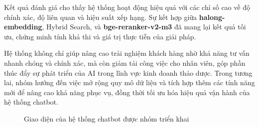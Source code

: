 \documentclass{article}
\numberwithin{equation}{section}
\numberwithin{equation}{section}
\begin{document}
Kết quả đánh giá cho thấy hệ thống hoạt động hiệu quả với các chỉ số cao về độ chính xác, độ liên quan và hiệu suất xếp hạng. Sự kết hợp giữa \textbf{halong-embedding}, Hybrid Search, và \textbf{bge-reranker-v2-m3} đã mang lại kết quả tối ưu, chứng minh tính khả thi và giá trị thực tiễn của giải pháp.

Hệ thống không chỉ giúp nâng cao trải nghiệm khách hàng nhờ khả năng tư vấn nhanh chóng và chính xác, mà còn giảm tải công việc cho nhân viên, góp phần thúc đẩy sự phát triển của AI trong lĩnh vực kinh doanh thảo dược. Trong tương lai, nhóm hướng đến việc mở rộng quy mô dữ liệu và tích hợp thêm các tính năng mới để nâng cao khả năng phục vụ, đồng thời tối ưu hóa hiệu quả vận hành của hệ thống chatbot.

\begin{figure}[!ht]
    \centering
    \caption{Giao diện của hệ thống chatbot được nhóm triển khai}
    \label{fig:interface}
\end{figure}
\newpage
\nocite{rotonx-ai-devs-02_cuongtm-vietnamese-rag-chatbot}
\nocite{protonx-ai-devs-02_quynhtl-owndata-rag-bot}
\printbibliography
\end{document}
